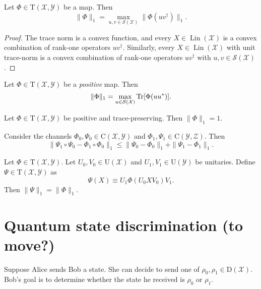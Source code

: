 \documentclass[12pt]{report}
\newcommand{\calY}{{\mathcal{Y}}}
\newcommand{\calS}{{\mathcal{S}}}
\newcommand{\calX}{{\mathcal{X}}}
\newcommand{\calZ}{{\mathcal{Z}}}
\newcommand{\rmC}{{\mathrm{C}}}
\newcommand{\rmD}{{\mathrm{D}}}
\newcommand{\rmT}{{\mathrm{T}}}
\newcommand{\rmU}{{\mathrm{U}}}
\DeclareMathOperator{\Lin}{Lin}
\begin{document}
\begin{prop}
	Let $\Phi\in\rmT(\calX,\calY)$ be a map. Then
	\begin{equation}
		\|\Phi\|_1 = \max_{u,v\in\calS(\calX)}\|\Phi(uv^\dagger)\|_1.
	\end{equation}
\end{prop}
\begin{proof}
	The trace norm is a convex function, and every $X\in\Lin(\calX)$ is a convex combination of rank-one operators $uv^\dagger$.
	Similarly, every $X\in\Lin(\calX)$ with unit trace-norm is a convex combination of rank-one operators $uv^\dagger$ with $u,v\in\calS(\calX)$.
\end{proof}

\begin{prop}
	Let $\Phi\in\rmT(\calX,\calY)$ be a \emph{positive} map. Then
	\begin{equation}
		\|\Phi\|_1 = \max_{u\in\calS(\calX)}\Tr[\Phi(uu^*)].
	\end{equation}
\end{prop}

\begin{prop}
	Let $\Phi\in\rmT(\calX,\calY)$ be positive and trace-preserving. Then
	$\|\Phi\|_1=1$.
\end{prop}

\begin{prop}
	Consider the channels
	$\Phi_0,\Psi_0\in\rmC(\calX,\calY)$ and
	$\Phi_1,\Psi_1\in\rmC(\calY,\calZ)$.
	Then
	\begin{equation}
		\|\Psi_1\circ\Psi_0 - \Phi_1\circ\Phi_0\|_1
		\le
		\|\Psi_0 - \Phi_0\|_1 +
		\|\Psi_1 - \Phi_1\|_1.
	\end{equation}
\end{prop}

\begin{prop}
	Let $\Phi\in\rmT(\calX,\calY)$. Let
	$U_0,V_0\in\rmU(\calX)$ and
	$U_1,V_1\in\rmU(\calY)$ be unitaries. Define $\Psi\in\rmT(\calX,\calY)$ as
	\begin{equation}
		\Psi(X) \equiv U_1 \Phi(U_0 X V_0) V_1.
	\end{equation}
	Then $\|\Psi\|_1 = \|\Phi\|_1$.
\end{prop}

\section{Quantum state discrimination (to move?)}

Suppose Alice sends Bob a state. She can decide to send one of $\rho_0,\rho_1\in\rmD(\calX)$. Bob's goal is to determine whether the state he received is $\rho_0$ or $\rho_1$.
\end{document}
